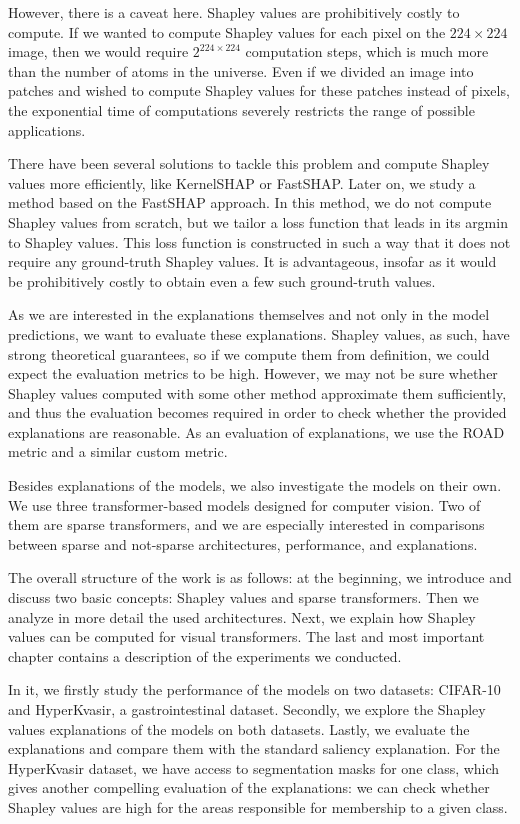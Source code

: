 \documentclass[en]{pracamgr}
\begin{document}
However, there is a caveat here. Shapley values are prohibitively costly to compute. If we wanted to compute Shapley values for each pixel on the $224 \times 224$ image, then we would require $2^{224\times 224}$ computation steps, which is much more than the number of atoms in the universe. Even if we divided an image into patches and wished to compute Shapley values for these patches instead of pixels, the exponential time of computations severely restricts the range of possible applications.

There have been several solutions to tackle this problem and compute Shapley values more efficiently, like KernelSHAP or FastSHAP. Later on, we study a method based on the FastSHAP approach. In this method, we do not compute Shapley values from scratch, but we tailor a loss function that leads in its argmin to Shapley values. This loss function is constructed in such a way that it does not require any ground-truth Shapley values. It is advantageous, insofar as it would be prohibitively costly to obtain even a few such ground-truth values.

As we are interested in the explanations themselves and not only in the model predictions, we want to evaluate these explanations. Shapley values, as such, have strong theoretical guarantees, so if we compute them from definition, we could expect the evaluation metrics to be high. However, we may not be sure whether Shapley values computed with some other method approximate them sufficiently, and thus the evaluation becomes required in order to check whether the provided explanations are reasonable. As an evaluation of explanations, we use the ROAD metric and a similar custom metric.


Besides explanations of the models, we also investigate the models on their own. We use three transformer-based models designed for computer vision. Two of them are sparse transformers, and we are especially interested in comparisons between sparse and not-sparse architectures, performance, and explanations.


The overall structure of the work is as follows: at the beginning, we introduce and discuss two basic concepts: Shapley values and sparse transformers. Then we analyze in more detail the used architectures. Next, we explain how Shapley values can be computed for visual transformers. The last and most important chapter contains a description of the experiments we conducted.


In it, we firstly study the performance of the models on two datasets: CIFAR-10 and HyperKvasir, a gastrointestinal dataset. Secondly, we explore the Shapley values explanations of the models on both datasets. Lastly, we evaluate  the explanations and compare them with the standard saliency explanation. For the HyperKvasir dataset, we have access to segmentation masks for one class, which gives another compelling evaluation of the explanations: we can check whether Shapley values are high for the areas responsible for membership to a given class.
\end{document}
